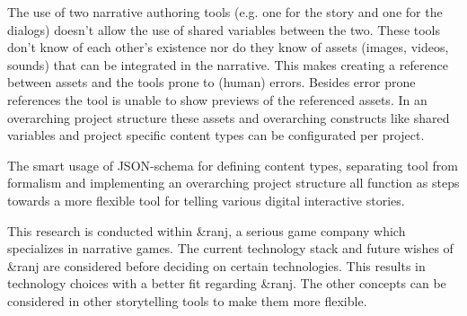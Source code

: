 The use of two narrative authoring tools (e.g. one for the story and one for the dialogs) doesn’t allow the use of shared variables between the two. These tools don’t know of each other’s existence nor do they know of assets (images, videos, sounds) that can be integrated in the narrative. This makes creating a reference between assets and the tools prone to (human) errors. Besides error prone references the tool is unable to show previews of the referenced assets. In an overarching project structure these assets and overarching constructs like shared variables and project specific content types can be configurated per project.

The smart usage of JSON-schema for defining content types, separating tool from formalism and implementing an overarching project structure all function as steps towards a more flexible tool for telling various digital interactive stories.

This research is conducted within \&ranj, a serious game company which specializes in narrative games. The current technology stack and future wishes of \&ranj are considered before deciding on certain technologies. This results in technology choices with a better fit regarding \&ranj. The other concepts can be considered in other storytelling tools to make them more flexible. 